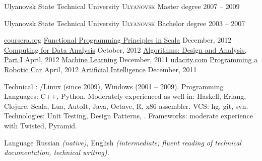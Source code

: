 \documentclass[unicode, 10pt, a4paper, oneside, fleqn]{article}
\begin{document}
\spacedhrule{0.5em}{-0.4em}

\headedsection
  {Ulyanovsk State Technical University}
  {\textsc{Ulyanovsk}} {
  \headedsubsection
    {Master degree}
    {2007 -- 2009} {
    }
  }

\headedsection
  {Ulyanovsk State Technical University}
  {\textsc{Ulyanovsk}} {
  \headedsubsection
    {Bachelor degree}
    {2003 -- 2007} {
    }
  }

\spacedhrule{0.5em}{-0.4em}

\headedsection
  {\href{http://www.coursera.org}{coursera.org}}
  {} {
  \headedsubsection
    {\href{https://docs.google.com/document/d/1AWaukQ0K4C-ZcuRRqYANJuYDOPxYH7MoVdXYKHPYJ8I/edit}
          {Functional Programming Principles in Scala}}
    {December, 2012} {}
  \headedsubsection
    {\href{https://docs.google.com/document/d/1Rh_5PSFQBBtEwMZIa5r69H5ONOjpX5jfiPorFIvQg5Y/edit}
          {Computing for Data Analysis}}
    {October, 2012} {}
  \headedsubsection
    {\href{https://docs.google.com/document/d/1j6LlyJUGM03TxqSImyHeHoa16dSCLZQop6zmrPe8YOw/edit}
          {Algorithms: Design and Analysis, Part I}}
    {April, 2012} {}
  \headedsubsection
    {\href{https://docs.google.com/document/d/11OT8thqIgBiwM80D_HjpiGtKTz5CnxiITPG_H6QbuUA/edit}
          {Machine Learning}}
    {December, 2011} {}
  }
\headedsection
  {\href{http://udacity.com}{udacity.com}}
  {} {
  \headedsubsection
    {\href{https://docs.google.com/document/d/1LpUyUwh_gGyPyKf-oxTDOy8ncQejwog1jhgMmtf59mY/edit}
          {Programming a Robotic Car}}
    {April, 2012} {}
  \headedsubsection
    {\href{https://docs.google.com/document/d/1wD_QEJ7mdzxbR_PMVEbZ_tZ0SyakJ_8Y1gBAj_S5Ufg/edit}
          {Artificial Intelligence}}
    {December, 2011} {}
  }

\spacedhrule{0.5em}{-0.4em}


\inlineheadsection  %
  {Technical}
  {: /Linux (since 2009), Windows (2001 -- 2009).
   Programming Languages: C++, Python.
   Moderately experienced as well in: Haskell, Erlang, Clojure, Scala, Lua, AutoIt,
   Java, Octave, R, x86 assembler.
   VCS: hg, git, svn.
   Technologies: Unit Testing, Design Patterns, .
   Frameworks: moderate experience with Twisted, Pyramid.
  }

\inlineheadsection
  {Language}
  {Russian \emph{(native)}, English \emph{(intermediate; fluent reading of
   technical documentation, technical writing).}}

%
%
\end{document}
